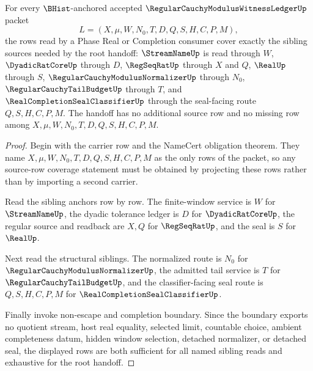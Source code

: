 \begin{theorem}
\label{thm:regular-cauchy-modulus-witness-ledger-source-row-coverage}
For every $\BHist$-anchored accepted $\RegularCauchyModulusWitnessLedgerUp$ packet
$$
L=(X,\mu,W,N_0,T,D,Q,S,H,C,P,M),
$$
the rows read by a Phase Real or Completion consumer cover exactly the sibling sources needed by the root handoff: $\StreamNameUp$ is read through $W$, $\DyadicRatCoreUp$ through $D$, $\RegSeqRatUp$ through $X$ and $Q$, $\RealUp$ through $S$, $\RegularCauchyModulusNormalizerUp$ through $N_0$, $\RegularCauchyTailBudgetUp$ through $T$, and $\RealCompletionSealClassifierUp$ through the seal-facing route $Q,S,H,C,P,M$. The handoff has no additional source row and no missing row among $X,\mu,W,N_0,T,D,Q,S,H,C,P,M$.
\end{theorem}
\begin{proof}
Begin with the carrier row and the NameCert obligation theorem. They name $X,\mu,W,N_0,T,D,Q,S,H,C,P,M$ as the only rows of the packet, so any source-row coverage statement must be obtained by projecting these rows rather than by importing a second carrier.

Read the sibling anchors row by row. The finite-window service is $W$ for $\StreamNameUp$, the dyadic tolerance ledger is $D$ for $\DyadicRatCoreUp$, the regular source and readback are $X,Q$ for $\RegSeqRatUp$, and the seal is $S$ for $\RealUp$.

Next read the structural siblings. The normalized route is $N_0$ for $\RegularCauchyModulusNormalizerUp$, the admitted tail service is $T$ for $\RegularCauchyTailBudgetUp$, and the classifier-facing seal route is $Q,S,H,C,P,M$ for $\RealCompletionSealClassifierUp$.

Finally invoke non-escape and completion boundary. Since the boundary exports no quotient stream, host real equality, selected limit, countable choice, ambient completeness datum, hidden window selection, detached normalizer, or detached seal, the displayed rows are both sufficient for all named sibling reads and exhaustive for the root handoff.
\end{proof}

